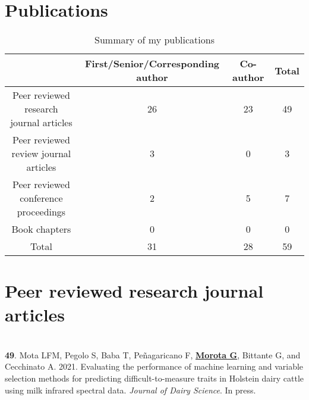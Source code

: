 \documentclass[margin,line,10pt]{res}
\newenvironment{list1}{
  \begin{list}{\ding{113}}{%
      \setlength{\itemsep}{0in}
      \setlength{\parsep}{0in} \setlength{\parskip}{0in}
      \setlength{\topsep}{0in} \setlength{\partopsep}{0in} 
      \setlength{\leftmargin}{0.17in}}}{\end{list}}
\begin{document}
\begin{resume}
\begin{list1}
 
\end{list1}

  
\vspace{0.5cm}


\section{\sc Publications}
\vspace{1cm}

\begin{table}[h!]
\centering
  \begin{tabular}{ |c|c|c|c| }
 \hline
 & First/Senior/Corresponding author & Co-author & Total \\  \hline
Peer reviewed research journal articles  & 26 & 23 & 49 \\  \hline
Peer reviewed review journal articles  & 3 & 0 & 3 \\  \hline
Peer reviewed conference proceedings & 2 & 5 & 7 \\ \hline 
Book chapters & 0 & 0 & 0 \\ \hline
Total & 31 &  28 & 59 \\ \hline
  \end{tabular}
    \caption{Summary of my publications}
\end{table}

\vspace{0.5cm}

\section{\sc Peer reviewed research journal articles}

\vspace{1.5cm}

\section{}
\begin{list1}

\item [{\bf 49}.] Mota LFM, Pegolo S, Baba T, Pe\~{n}agaricano F, \textbf{\underline{Morota G}}, Bittante G, and Cecchinato A. 2021. Evaluating the performance of machine learning and variable selection methods for predicting difficult-to-measure traits in Holstein dairy cattle using milk infrared spectral data. \emph{Journal of Dairy Science}. In press. 


\end{list1}
\end{resume}
\end{document}
